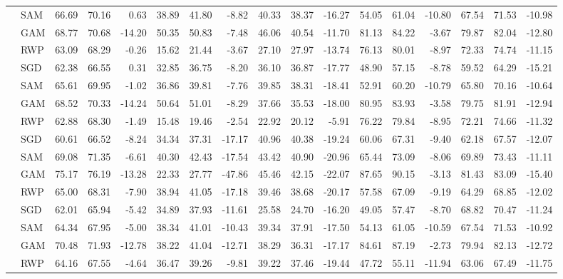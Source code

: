 \begin{table}[ht]
\begin{tabular}{@{}l l r r r r r r r r r r r r r r r@{}}
 & SAM & 66.69 & 70.16 & 0.63 & 38.89 & 41.80 & -8.82 & 40.33 & 38.37 & -16.27 & 54.05 & 61.04 & -10.80 & 67.54 & 71.53 & -10.98 \\
 & GAM & 68.77 & 70.68 & -14.20 & 50.35 & 50.83 & -7.48 & 46.06 & 40.54 & -11.70 & 81.13 & 84.22 & -3.67 & 79.87 & 82.04 & -12.80 \\
 & RWP & 63.09 & 68.29 & -0.26 & 15.62 & 21.44 & -3.67 & 27.10 & 27.97 & -13.74 & 76.13 & 80.01 & -8.97 & 72.33 & 74.74 & -11.15 \\
\addlinespace[2pt]
\multirow{4}{*}{\textbf{OLoRA}} & SGD & 62.38 & 66.55 & 0.31 & 32.85 & 36.75 & -8.20 & 36.10 & 36.87 & -17.77 & 48.90 & 57.15 & -8.78 & 59.52 & 64.29 & -15.21 \\
 & SAM & 65.61 & 69.95 & -1.02 & 36.86 & 39.81 & -7.76 & 39.85 & 38.31 & -18.41 & 52.91 & 60.20 & -10.79 & 65.80 & 70.16 & -10.64 \\
 & GAM & 68.52 & 70.33 & -14.24 & 50.64 & 51.01 & -8.29 & 37.66 & 35.53 & -18.00 & 80.95 & 83.93 & -3.58 & 79.75 & 81.91 & -12.94 \\
 & RWP & 62.88 & 68.30 & -1.49 & 15.48 & 19.46 & -2.54 & 22.92 & 20.12 & -5.91 & 76.22 & 79.84 & -8.95 & 72.21 & 74.66 & -11.32 \\
\addlinespace[2pt]
\multirow{4}{*}{\textbf{InfLoRA}} & SGD & 60.61 & 66.52 & -8.24 & 34.34 & 37.31 & -17.17 & 40.96 & 40.38 & -19.24 & 60.06 & 67.31 & -9.40 & 62.18 & 67.57 & -12.07 \\
 & SAM & 69.08 & 71.35 & -6.61 & 40.30 & 42.43 & -17.54 & 43.42 & 40.90 & -20.96 & 65.44 & 73.09 & -8.06 & 69.89 & 73.43 & -11.11 \\
 & GAM & 75.17 & 76.19 & -13.28 & 22.33 & 27.77 & -47.86 & 45.46 & 42.15 & -22.07 & 87.65 & 90.15 & -3.13 & 81.43 & 83.09 & -15.40 \\
 & RWP & 65.00 & 68.31 & -7.90 & 38.94 & 41.05 & -17.18 & 39.46 & 38.68 & -20.17 & 57.58 & 67.09 & -9.19 & 64.29 & 68.85 & -12.02 \\
\addlinespace[2pt]
\multirow{4}{*}{\textbf{SDLoRA}} & SGD & 62.01 & 65.94 & -5.42 & 34.89 & 37.93 & -11.61 & 25.58 & 24.70 & -16.20 & 49.05 & 57.47 & -8.70 & 68.82 & 70.47 & -11.24 \\
 & SAM & 64.34 & 67.95 & -5.00 & 38.34 & 41.01 & -10.43 & 39.34 & 37.91 & -17.50 & 54.13 & 61.05 & -10.59 & 67.54 & 71.53 & -10.92 \\
 & GAM & 70.48 & 71.93 & -12.78 & 38.22 & 41.04 & -12.71 & 38.29 & 36.31 & -17.17 & 84.61 & 87.19 & -2.73 & 79.94 & 82.13 & -12.72 \\
 & RWP & 64.16 & 67.55 & -4.64 & 36.47 & 39.26 & -9.81 & 39.22 & 37.46 & -19.44 & 47.72 & 55.11 & -11.94 & 63.06 & 67.49 & -11.75 \\
\bottomrule
\end{tabular}
\end{table}